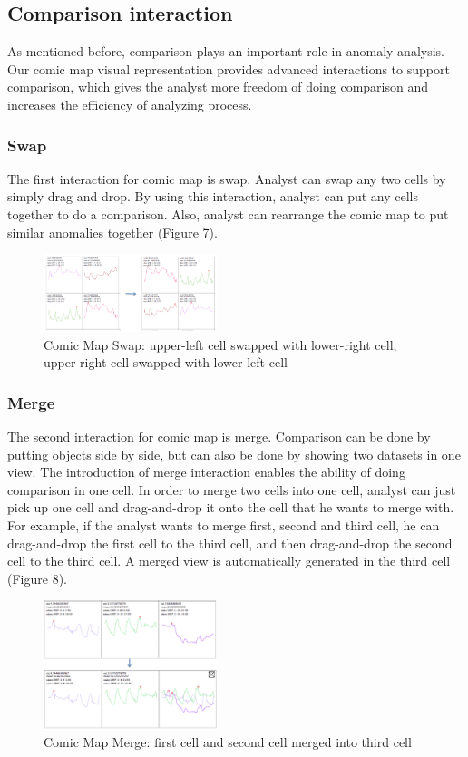 \documentclass{vgtc}                          %
\begin{document}
\subsection{Comparison interaction}
As mentioned before, comparison plays an important role in anomaly analysis. Our comic map visual representation provides advanced interactions to support comparison, which gives the analyst more freedom of doing comparison and increases the efficiency of analyzing process.

\subsubsection{Swap}
The first interaction for comic map is swap. Analyst can swap any two cells by simply drag and drop. By using this interaction, analyst can put any cells together to do a comparison.  Also, analyst can rearrange the comic map to put similar anomalies together (Figure 7).  

\begin{figure}[htb]
	\centering
	\includegraphics[width=0.45\textwidth]{swap.jpg}
	\caption{Comic Map Swap: upper-left cell swapped with lower-right cell, upper-right cell swapped with lower-left cell}
\end{figure}

\subsubsection{Merge}
The second interaction for comic map is merge. Comparison can be done by putting objects side by side, but can also be done by showing two datasets in one view. The introduction of merge interaction enables the ability of doing comparison in one cell. 
In order to merge two cells into one cell, analyst can just pick up one cell and drag-and-drop it onto the cell that he wants to merge with. For example, if the analyst wants to merge first, second and third cell, he can drag-and-drop the first cell to the third cell, and then drag-and-drop the second cell to the third cell. A merged view is automatically generated in the third cell (Figure 8).

\begin{figure}[htb]
	\centering
	\includegraphics[width=0.45\textwidth]{merge.jpg}
	\caption{Comic Map Merge: first cell and second cell merged into third cell}
\end{figure}
 
\end{document}

